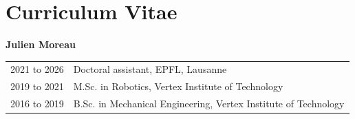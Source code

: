 \documentclass[11pt,oneside,a4paper]{report}
\begin{document}
\appendix





\chapter*{Curriculum Vitae}
\noindent\textbf{Julien Moreau}\par\medskip
\noindent\begin{tabular}{@{}ll@{}}
2021 to 2026 & Doctoral assistant, EPFL, Lausanne\\
2019 to 2021 & M.Sc. in Robotics, Vertex Institute of Technology\\
2016 to 2019 & B.Sc. in Mechanical Engineering, Vertex Institute of Technology\\
\end{tabular}
\end{document}
